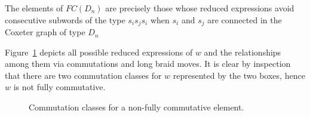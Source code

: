 \begin{remark}\label{subwords}
The elements of $FC(D_n)$ are precisely those whose reduced expressions avoid consecutive subwords of the type $s_{i}s_{j}s_{i}$ when $s_{i}$ and $s_{j}$ are connected in the Coxeter graph of type $D_n$
\end{remark}

\begin{example}
Figure~\ref{fig:commclasses} depicts all possible reduced expressions of $w$ and the relationships among them via commutations and long braid moves. It is clear by inspection that there are two commutation classes for $w$ represented by the two boxes, hence $w$ is not fully commutative.

\begin{figure}[h]
\centering
{}
\caption{Commutation classes for a non-fully commutative element.}
\label{fig:commclasses}
\end{figure}


\end{example}
